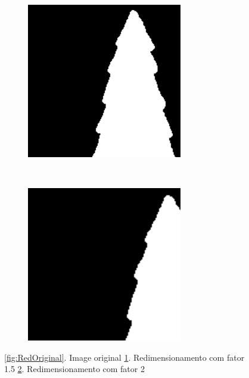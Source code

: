 \documentclass[
	article,			%
	11pt,				%
	oneside,			%
	a4paper,			%
	english,			%
	brazil,				%
	sumario=tradicional
	]{abntex2}
\begin{document}
\begin{figure}
\begin{subfigure}[b]{0.3\textwidth}
                \includegraphics[width=\textwidth,scale=1]{imagens/ex1/imageScale2.png}
                \caption{}
                \label{fig:Red2}
        \end{subfigure}
        ~
        \begin{subfigure}[b]{0.3\textwidth}
  				\includegraphics[width=\textwidth,scale=1]{imagens/ex1/imageScale3.png}
                \caption{}
                \label{fig:Red3}   
        \end{subfigure}
        \caption{ 
        \ref{fig:RedOriginal}. Image original
        \ref{fig:Red2}. Redimensionamento com fator 1.5
        \ref{fig:Red3}. Redimensionamento com fator 2
        }
        \label{fig:redimensionamento}
\end{figure}
\end{document}

